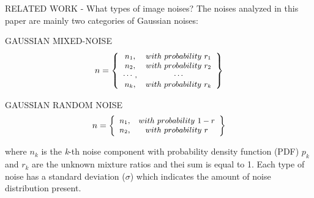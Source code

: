 \begin{frame}{RELATED WORK - What types of image noises?}
    The noises analyzed in this paper are mainly two categories of Gaussian 
    noises:
    \begin{minipage}{\linewidth}
        \centering
        \begin{minipage}{0.45\linewidth}
            \begin{block}{GAUSSIAN MIXED-NOISE}
                $$
                \small
                n = \left\{
                    \begin{array}{cc}
                        n_1, & with~probability~r_1\\
                        n_2, & with~probability~r_2\\
                        \cdots, & \cdots\\
                        n_k, & with~probability~r_k\\ 
                    \end{array}
                    \right\}
                $$
            \end{block}  
        \end{minipage}
        \hspace{0.05\linewidth}
        \begin{minipage}{0.47\linewidth}
            \begin{block}{GAUSSIAN RANDOM NOISE}
                $$
                \small
                n = \left\{
                    \begin{array}{cc}
                        n_1, & with~probability~1-r\\
                        n_2, & with~probability~r\\
                    \end{array}
                    \right\}
                $$
            \end{block} 
        \end{minipage}
    \end{minipage}
    where $ n_k $ is the \emph{k}-th noise component with probability density function (PDF) 
    $ p_k $ and $ r_k $ are the unknown mixture ratios and thei sum is equal to 
    1. Each type of noise has a standard deviation ($\sigma$) which indicates the 
    amount of noise distribution present.     
\end{frame}

